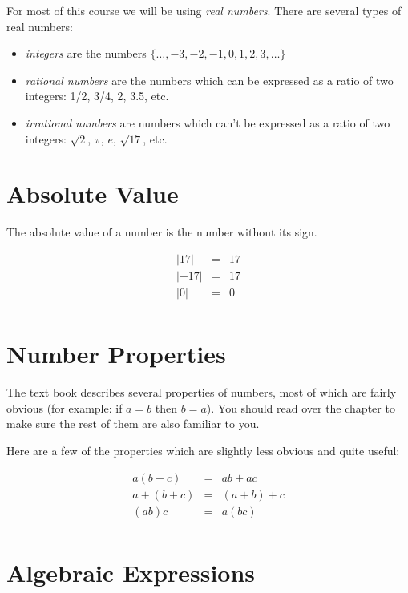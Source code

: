 \documentclass[fleqn]{article}
\begin{document}
For most of this course we will be using {\em real numbers}.  There are several types of real numbers:

\begin{itemize}
  \item {\em integers} are the numbers \( \{ \ldots, -3, -2, -1, 0, 1, 2, 3, \ldots \} \)
  \item {\em rational numbers} are the numbers which can be expressed as a ratio of two integers: 
    1/2, 3/4, 2, 3.5, etc.
  \item {\em irrational numbers} are numbers which can't be expressed as a ratio of two integers:
    \( \sqrt{2} \), \( \pi \), \( e \), \( \sqrt{17}\), etc.
\end{itemize}

\section{Absolute Value}

The absolute value of a number is the number without its sign.

\begin{eqnarray*}
  | 17 |  & = & 17 \\
  | -17 | & = & 17 \\
  | 0 | & = & 0 \\
\end{eqnarray*}

\section{Number Properties}

The text book describes several properties of numbers, most of which are fairly obvious (for example: if \( a = b \)
then \( b = a \)).  You should read over the chapter to make sure the rest of them are also familiar to you.  

Here are a few of the properties which are slightly less obvious and quite useful:

\begin{eqnarray*}
  a (b + c) & = & ab + ac \\
  a + (b + c) & = & (a + b) + c \\
  (ab)c & = & a(bc) \\
\end{eqnarray*}

\section{Algebraic Expressions}
\end{document}
